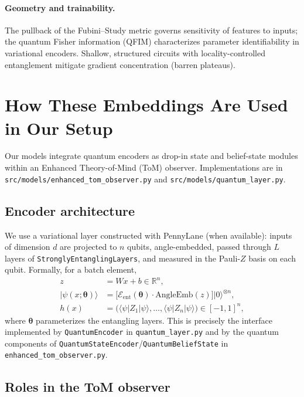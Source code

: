 \documentclass[11pt]{article}
\begin{document}
\paragraph{Geometry and trainability.} The pullback of the Fubini--Study metric governs sensitivity of features to inputs; the quantum Fisher information (QFIM) characterizes parameter identifiability in variational encoders. Shallow, structured circuits with locality-controlled entanglement mitigate gradient concentration (barren plateaus).

\section{How These Embeddings Are Used in Our Setup}

Our models integrate quantum encoders as drop-in state and belief-state modules within an Enhanced Theory-of-Mind (ToM) observer. Implementations are in \texttt{src/models/enhanced\_tom\_observer.py} and \texttt{src/models/quantum\_layer.py}.

\subsection{Encoder architecture}

We use a variational layer constructed with PennyLane (when available): inputs of dimension \(d\) are projected to \(n\) qubits, angle-embedded, passed through \(L\) layers of \texttt{StronglyEntanglingLayers}, and measured in the Pauli-$Z$ basis on each qubit. Formally, for a batch element,
\begin{align}
  z &= W x + b \in \mathbb{R}^{n},\\
  \lvert\psi(x;\bm{\theta})\rangle &= \Big[\mathcal{E}_{\text{ent}}(\bm{\theta})\cdot \mathrm{AngleEmb}(z)\Big]\lvert 0\rangle^{\otimes n},\\
  h(x) &= \big(\langle\psi\rvert Z_1\lvert\psi\rangle,\ldots,\langle\psi\rvert Z_n\lvert\psi\rangle\big) \in [-1,1]^n,
\end{align}
where \(\bm{\theta}\) parameterizes the entangling layers. This is precisely the interface implemented by \texttt{QuantumEncoder} in \texttt{quantum\_layer.py} and by the quantum components of \texttt{QuantumStateEncoder}/\texttt{QuantumBeliefState} in \texttt{enhanced\_tom\_observer.py}.

\subsection{Roles in the ToM observer}
\end{document}

